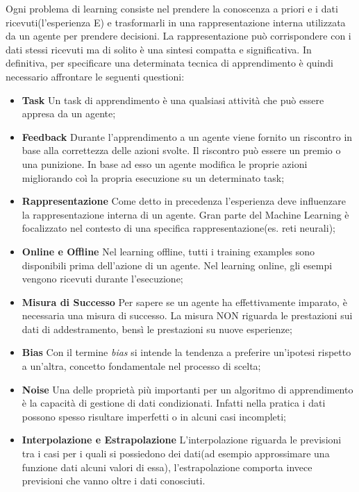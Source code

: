 Ogni problema di learning consiste nel prendere la conoscenza a priori e i dati ricevuti(l'esperienza E) e 
trasformarli in una rappresentazione  interna utilizzata da un agente per prendere decisioni. La rappresentazione
può corrispondere con i dati stessi ricevuti ma di solito è una sintesi compatta e significativa. 
In definitiva, per specificare una determinata tecnica di apprendimento è quindi necessario affrontare le seguenti\cite{PooleMackworth17} questioni:
\begin{itemize}
  \item \textbf{Task} Un task di apprendimento è una qualsiasi attività che può essere appresa da un agente;
  \item \textbf{Feedback} Durante l'apprendimento a un agente viene fornito un riscontro in base alla correttezza delle azioni svolte. Il riscontro può essere un premio o una punizione.  In base ad esso un agente modifica le proprie azioni
  migliorando coì la propria esecuzione su un determinato task;
  \item \textbf{Rappresentazione} Come detto in precedenza l'esperienza deve influenzare la rappresentazione interna di un agente.
  Gran parte del Machine Learning è focalizzato nel contesto di una specifica rappresentazione(es. reti neurali);
  \item \textbf{Online e Offline} Nel learning offline, tutti i training examples sono disponibili prima dell'azione di un agente. Nel learning online,
  gli esempi vengono ricevuti durante l'esecuzione;
  \item \textbf{Misura di Successo} Per sapere se un agente ha effettivamente imparato, è necessaria una misura di successo. La misura NON riguarda le prestazioni sui dati di addestramento, bensì le prestazioni su nuove esperienze;
  \item \textbf{Bias} Con il termine \emph{bias} si intende la tendenza a preferire un'ipotesi rispetto a un'altra, concetto fondamentale nel processo di scelta;
  \item \textbf{Noise} Una delle proprietà più importanti per un algoritmo di apprendimento è la capacità di gestione di dati condizionati.
  Infatti nella pratica i dati possono spesso risultare imperfetti o in alcuni casi incompleti;
  \item \textbf{Interpolazione e Estrapolazione} L'interpolazione riguarda le previsioni tra i  casi per i quali si possiedono dei dati(ad esempio approssimare una funzione dati alcuni valori di essa), l'estrapolazione comporta invece 
  previsioni che vanno oltre i dati conosciuti.
\end{itemize}
